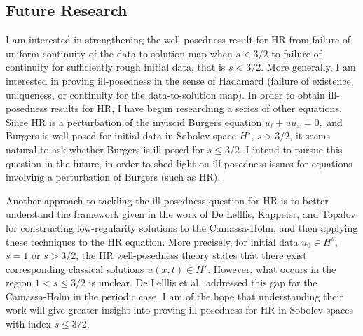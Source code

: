 \documentclass[12pt,reqno]{amsart}
\begin{document}
\subsection{Future Research} 
\label{ssec:fut-res}
 I am interested in strengthening the well-posedness
result for HR from failure of uniform continuity of the data-to-solution map
when $s<3/2$ to failure of continuity for sufficiently rough initial data,  that
is $s<3/2$.
More generally, I am interested in proving
ill-posedness in the sense of Hadamard (failure of existence, uniqueness, or
continuity for the data-to-solution map). In order to obtain ill-posedness
results for HR, I have begun researching a series of other equations. Since HR is a perturbation of the
inviscid Burgers  equation
$
    u_{t} + u u_{x} = 0,
$
and Burgers is well-posed for initial data in Sobolev space $H^{s}$, $s > 3/2$,
it seems natural to ask whether Burgers is ill-posed for $s \le 3/2$. I intend to
pursue this question in the future, in order to shed-light on ill-posedness
issues for equations involving a perturbation of Burgers (such as HR).

Another approach to tackling the ill-posedness question for HR
is to better understand the framework given in the work 
of De Lelllis,
Kappeler, and Topalov \cite{Lellis_2007_Low-regularity-} for constructing
low-regularity solutions to the Camassa-Holm, and then applying these techniques
to the HR equation. More precisely, for initial data $u_{0} \in H^{s}$, $s =1$
or $s > 3/2$, the HR well-posedness theory states that there exist corresponding
classical solutions $u(x,t) \in H^{s}$. However, what occurs in the region $1 <
s \le 3/2$ is unclear. De Lelllis et al.\ addressed this gap for the
Camassa-Holm in the periodic case. I am of the hope that understanding their
work will give greater insight into proving ill-posedness for HR in Sobolev
spaces with index $s \le 3/2$. 
\end{document}

